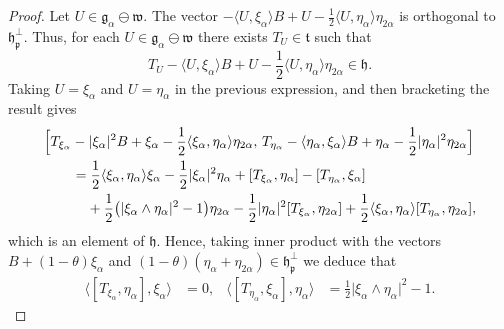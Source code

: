 \documentclass[12pt, a4paper]{amsart}
\newcommand{\g}{\mathfrak}
\theoremstyle{definition}
\begin{document}
\begin{proof}
Let $U\in\g{g}_\alpha\ominus\g{w}$.
The vector $-\langle U,\xi_\alpha\rangle B+U-\frac{1}{2}\langle U,\eta_\alpha\rangle\eta_{2\alpha}$
is orthogonal to $\g{h}_{\g{p}}^\perp$.
Thus, for each $U\in\g{g}_\alpha\ominus\g{w}$ there exists $T_U\in\g{t}$ such that
\begin{equation}\label{eq:tangent-vectors}
T_U-\langle U,\xi_\alpha\rangle B+U-\frac{1}{2}\langle U,\eta_\alpha\rangle\eta_{2\alpha}\in\g{h}.
\end{equation}
Taking $U=\xi_\alpha$ and $U=\eta_\alpha$ in the previous expression, and then bracketing the result gives
\begin{align*}
&
\Bigl[T_{\xi_\alpha}-\lvert\xi_\alpha\rvert^2 B+\xi_\alpha
-\frac{1}{2}\langle \xi_\alpha,\eta_\alpha\rangle\eta_{2\alpha},\,
T_{\eta_\alpha}-\langle \eta_\alpha,\xi_\alpha\rangle B+\eta_\alpha
-\frac{1}{2}\lvert\eta_\alpha\rvert^2\eta_{2\alpha}\Bigr]\\
&\qquad{}=\frac{1}{2}\langle\xi_\alpha,\eta_\alpha\rangle\xi_\alpha
-\frac{1}{2}\lvert\xi_\alpha\rvert^2\eta_\alpha
+[T_{\xi_\alpha},\eta_\alpha]-[T_{\eta_\alpha},\xi_\alpha]\\
&\qquad\phantom{{}=}{}+\frac{1}{2}\bigl(\lvert\xi_\alpha\wedge\eta_\alpha\rvert^2-1\bigr)\eta_{2\alpha}
-\frac{1}{2}\lvert\eta_\alpha\rvert^2[T_{\xi_\alpha},\eta_{2\alpha}]
+\frac{1}{2}\langle\xi_\alpha,\eta_\alpha\rangle[T_{\eta_\alpha},\eta_{2\alpha}],
\end{align*}
which is an element of $\g{h}$.
Hence, taking inner product with the vectors $B+(1-\theta)\xi_\alpha$ and $(1-\theta)(\eta_\alpha+\eta_{2\alpha})\in\g{h}_{\g{p}}^\perp$ we deduce that
\begin{align}\label{eq:Txieta}
\langle[T_{\xi_\alpha},\eta_\alpha],\xi_\alpha\rangle
&{}=0,&
\langle[T_{\eta_\alpha},\xi_\alpha],\eta_\alpha\rangle
&{}=\frac{1}{2}\lvert\xi_\alpha\wedge\eta_\alpha\rvert^2-1.
\end{align}


\end{proof}
\end{document}
